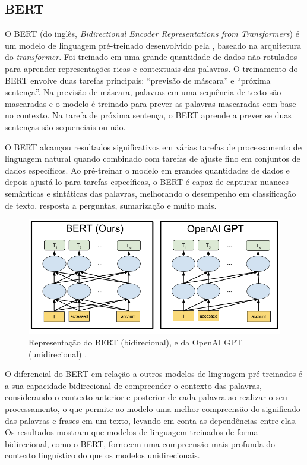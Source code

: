 \subsection{BERT}

O BERT (do inglês, \textit{Bidirectional Encoder Representations from Transformers}) é um modelo de linguagem pré-treinado desenvolvido pela , baseado na arquitetura do \textit{transformer}. Foi treinado em uma grande quantidade de dados não rotulados para aprender representações ricas e contextuais das palavras. O treinamento do BERT envolve duas tarefas principais: ``previsão de máscara'' e ``próxima sentença''. Na previsão de máscara, palavras em uma sequência de texto são mascaradas e o modelo é treinado para prever as palavras mascaradas com base no contexto. Na tarefa de próxima sentença, o BERT aprende a prever se duas sentenças são sequenciais ou não.

O BERT alcançou resultados significativos em várias tarefas de processamento de linguagem natural quando combinado com tarefas de ajuste fino em conjuntos de dados específicos. Ao pré-treinar o modelo em grandes quantidades de dados e depois ajustá-lo para tarefas específicas, o BERT é capaz de capturar nuances semânticas e sintáticas das palavras, melhorando o desempenho em classificação de texto, resposta a perguntas, sumarização e muito mais.

\begin{figure}[!htbp]
	\centering
	\includegraphics[scale=0.4]{imagens/BERT.png}
    \caption {Representação do BERT (bidirecional), e da OpenAI GPT (unidirecional) \cite{BERTImagem}.}
\end{figure}

O diferencial do BERT em relação a outros modelos de linguagem pré-treinados é a sua capacidade bidirecional de compreender o contexto das palavras, considerando o contexto anterior e posterior de cada palavra ao realizar o seu processamento, o que permite ao modelo uma melhor compreensão do significado das palavras e frases em um texto, levando em conta as dependências entre elas. Os resultados mostram que modelos de linguagem treinados de forma bidirecional, como o BERT, fornecem uma compreensão mais profunda do contexto linguístico do que os modelos unidirecionais.

